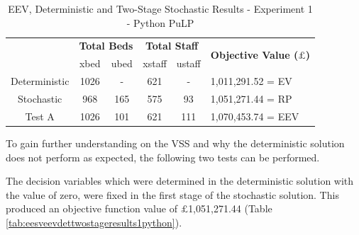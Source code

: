 \documentclass[../thesis.tex]{subfiles}
\begin{document}
\begin{table}[h!]
    \centering
    \begin{tabular}{cccccl}\toprule
 & \multicolumn{2}{l}{\textbf{Total Beds}} & \multicolumn{2}{c}{\textbf{Total Staff}} & \multirow{2}{*}{\textbf{Objective Value ($\pounds$)}}\\ \cmidrule(lr){2-3} \cmidrule(lr){4-5}
 & xbed           & ubed          & xstaff         & ustaff         \\ \midrule     
      Deterministic & 1026 & - &  621 & - & 1,011,291.52 =  EV \\ \midrule
      Stochastic & 968  & 165 &  575 & 93 &1,051,271.44 = RP\\\midrule
      Test A & 1026 & 101 & 621 & 111 & 1,070,453.74 = EEV \\\bottomrule
    \end{tabular}
    \caption{EEV, Deterministic and Two-Stage Stochastic Results - Experiment 1 - Python PuLP}
    \label{tab:eevdettwostageresults1python}
\end{table}
To gain further understanding on the VSS and why the deterministic solution does not perform as expected, the following two tests can be performed.

The decision variables which were determined in the deterministic solution with the value of zero, were fixed in the first stage of the stochastic solution. This produced an objective function value of $\pounds$1,051,271.44 (Table \ref{tab:eesveevdettwostageresults1python}).
\end{document}

